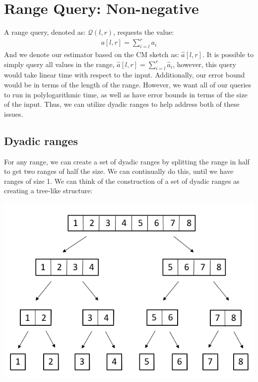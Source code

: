 \documentclass[11pt]{article}
\begin{document}
\section{Range Query: Non-negative}
A range query, denoted as: $\mathcal{Q}(l,r)$, requests the value:
\begin{align*}
    a[l,r] = \sum_{i=l}^r a_i
\end{align*}
And we denote our estimator based on the CM sketch as: $\hat a[l,r]$. It is possible to simply query all values in the range, $\hat a[l,r] = \sum_{i=l}^r \hat a_i$, however, this query would take linear time with respect to the input. Additionally, our error bound would be in terms of the length of the range. However, we want all of our queries to run in polylogarithmic time, as well as have error bounds in terms of the size of the input. Thus, we can utilize dyadic ranges to help address both of these issues.
\subsection{Dyadic ranges}
For any range, we can create a set of dyadic ranges by splitting the range in half to get two ranges of half the size. We can continually do this, until we have ranges of size 1. We can think of the construction of a set of dyadic ranges as creating a tree-like structure:
\begin{center}\includegraphics[scale=0.3]{dyadic_ranges.png}\end{center}
\end{document}
